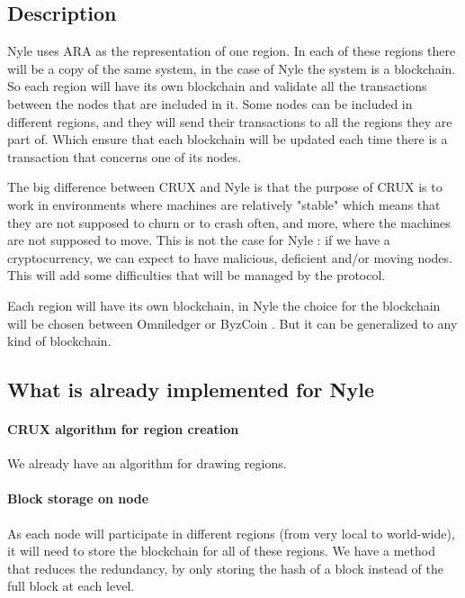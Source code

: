\documentclass[a4paper,11pt,oneside]{report}
\begin{document}
\subsection{Description}

Nyle uses ARA as the representation of one region. In each of these regions
there will be a copy of the same system, in the case of Nyle the system is a
blockchain. So each region will have its own blockchain and validate all the
transactions between the nodes that are included in it. Some nodes can be
included in different regions, and they will send their transactions to all the
regions they are part of. Which ensure that each blockchain will be updated
each time there is a transaction that concerns one of its nodes.

The big difference between CRUX \cite{Basescu2014} and Nyle is that the purpose
of CRUX \cite{Basescu2014} is to work in environments where machines are
relatively "stable" which means that they are not supposed to churn or to crash
often, and more, where the machines are not supposed to move. This is not the
case for Nyle : if we have a cryptocurrency, we can expect to have malicious,
deficient and/or moving nodes.  This will add some difficulties that will be
managed by the protocol.

Each region will have its own blockchain, in Nyle the choice for the blockchain
will be chosen between Omniledger \cite{Kokoris-Kogias2017} or ByzCoin
\cite{Kogias2016}. But it can be generalized to any kind of blockchain.

\subsection{What is already implemented for Nyle} 



\paragraph{CRUX algorithm for region creation} 
We already have an algorithm for drawing regions.

\paragraph{Block storage on node} As each node will participate in
different regions (from very local to world-wide), it will need to store the
blockchain for all of these regions. We have a method that reduces the
redundancy, by only storing the hash of a block instead of the full block at
each level. 
\end{document}
